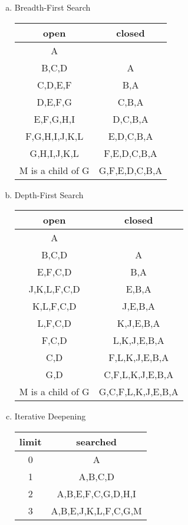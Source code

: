 \documentclass{math}
\begin{document}
\begin{enumerate}[(a)]
  \item Breadth-First Search
  \begin{center}
    \begin{tabular}{|c|c|}
      \hline
      open & closed \\ \hline
      A & \\ \hline
      B,C,D & A \\ \hline
      C,D,E,F & B,A \\ \hline
      D,E,F,G & C,B,A \\ \hline
      E,F,G,H,I & D,C,B,A \\ \hline
      F,G,H,I,J,K,L & E,D,C,B,A \\ \hline
      G,H,I,J,K,L & F,E,D,C,B,A \\ \hline
      M is a child of G & G,F,E,D,C,B,A \\ \hline
    \end{tabular}
  \end{center}
  \item Depth-First Search
  \begin{center}
    \begin{tabular}{|c|c|}
      \hline
      open & closed \\ \hline
      A & \\ \hline
      B,C,D & A \\ \hline
      E,F,C,D & B,A \\ \hline
      J,K,L,F,C,D & E,B,A \\ \hline
      K,L,F,C,D & J,E,B,A \\ \hline
      L,F,C,D & K,J,E,B,A \\ \hline
      F,C,D & L,K,J,E,B,A \\ \hline
      C,D & F,L,K,J,E,B,A \\ \hline
      G,D & C,F,L,K,J,E,B,A \\ \hline
      M is a child of G & G,C,F,L,K,J,E,B,A \\ \hline
    \end{tabular}
  \end{center}
  \item Iterative Deepening
  \begin{center}
    \begin{tabular}{|c|c|}
      \hline
      limit & searched \\ \hline
      0 & A \\ \hline
      1 & A,B,C,D \\ \hline
      2 & A,B,E,F,C,G,D,H,I \\ \hline
      3 & A,B,E,J,K,L,F,C,G,M \\ \hline
    \end{tabular}
  \end{center}
\end{enumerate}
\end{document}

